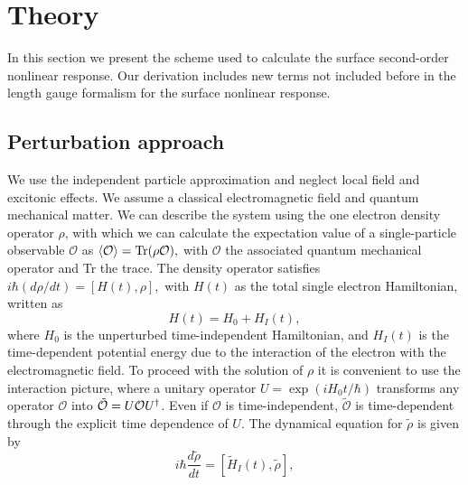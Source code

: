 \documentclass[floatfix,prb,aps,superscriptaddress,11pt,preprint,letterpaper]{revtex4}
\def\chon{red}
\begin{document}
\section{Theory}

\label{theory}

In this section we present the scheme used to calculate the surface second-order
nonlinear response.
Our derivation includes new terms not included
before in the length gauge formalism for the surface nonlinear
response. 

\subsection{Perturbation approach}

We use the independent particle approximation and neglect local field
and excitonic effects{\color{\chon}. We assume a classical} electromagnetic field
{\color{\chon} and quantum mechanical matter.}
We can describe the system using 
the one electron density
operator ${\rho}$, with which we can calculate the expectation value of a
single-particle observable $\mathcal{O}$ as 
$\langle{\cal O}\rangle=\mbox{Tr}({\rho} {\cal O}),  
\label{calo}$
with $\mathcal{O}$ the associated quantum mechanical operator and Tr
the trace. 
The density operator satisfies
$
i\hbar (d{\rho}/dt)=[H(t),{\rho}],  
\label{rho}
$
with $H(t)$ as the total single electron Hamiltonian, written as 
\begin{equation*}
H(t)=H_{0}+H_{I}(t),  
\label{ache}
\end{equation*}
where $H_{0}$ is the unperturbed time-independent Hamiltonian, and $H_{I}(t)$
is the time-dependent potential energy due to the interaction of the
electron with the electromagnetic field.
To proceed with the solution of $\rho$  it is convenient to use the
interaction picture, where a unitary operator $U=\exp ({iH_{0}t/\hbar })$
transforms any operator $\mathcal{O}$ into 
$\tilde{\mathcal{O}}=U{\cal O}U^{\dagger }$. Even if $\mathcal{O}$ 
{\color{\chon} is time-independent}, 
$\tilde{\mathcal{O}}$ {\color{\chon} is time-dependent} through the explicit
time dependence of $U$. 
The dynamical 
equation for $\tilde{\rho}$ is 
given by
\begin{equation*}
i\hbar \frac{d\tilde{{\rho}}}{dt}=[\tilde{H}_{I}(t),\tilde{{\rho}}],  
\label{rho1}
\end{equation*}
\end{document}
